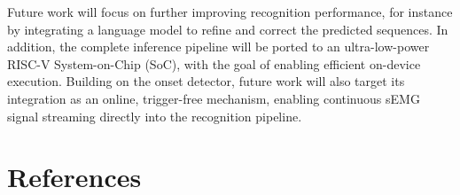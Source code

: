 \documentclass{article}
\begin{document}
Future work will focus on further improving recognition performance, for instance by integrating a language model to refine and correct the predicted sequences. In addition, the complete inference pipeline will be ported to an ultra-low-power RISC-V System-on-Chip (SoC), with the goal of enabling efficient on-device execution. Building on the onset detector, future work will also target its integration as an online, trigger-free mechanism, enabling continuous sEMG signal streaming directly into the recognition pipeline.

\section*{References}

\vspace{4.5pt}

{\scriptsize\setlength{\bibitemsep}{4pt}\setlength{\bibhang}{0.8em}
\printbibliography[heading=none]}
\end{document}
